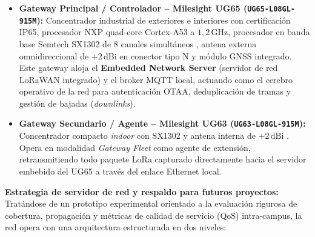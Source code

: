 \documentclass[12pt,oneside,openany,spanish,oldfontcommands]{memoir}
\begin{document}
\begin{itemize}
    \item \textbf{Gateway Principal / Controlador -- Milesight UG65 (\texttt{UG65-L08GL-915M}):}
    Concentrador industrial de exteriores e interiores con certificación IP65, procesador NXP
    quad-core Cortex-A53 a $1,2\,\text{GHz}$, procesador en banda base Semtech SX1302 de 8 canales
    simultáneos \parencite{semtech_sx1302,milesight_ug65}, antena externa omnidireccional de
    $+2\,\text{dBi}$ en conector tipo N y módulo GNSS integrado. Este gateway aloja el
    \textbf{Embedded Network Server} (servidor de red LoRaWAN integrado) y el broker MQTT local,
    actuando como el cerebro operativo de la red para autenticación OTAA, deduplicación de tramas y
    gestión de bajadas (\textit{downlinks}).

    \item \textbf{Gateway Secundario / Agente -- Milesight UG63 (\texttt{UG63-L08GL-915M}):}
    Concentrador compacto \textit{indoor} con SX1302 y antena interna de $+2\,\text{dBi}$
    \parencite{milesight_ug63}. Opera en modalidad \textit{Gateway Fleet} como agente de extensión,
    retransmitiendo todo paquete LoRa capturado directamente hacia el servidor embebido del UG65 a
    través del enlace Ethernet local.
\end{itemize}

\textbf{Estrategia de servidor de red y respaldo para futuros proyectos:} Tratándose de un
prototipo experimental orientado a la evaluación rigurosa de cobertura, propagación y métricas de
calidad de servicio (QoS) intra-campus, la red opera con una arquitectura estructurada en dos niveles:
\end{document}
